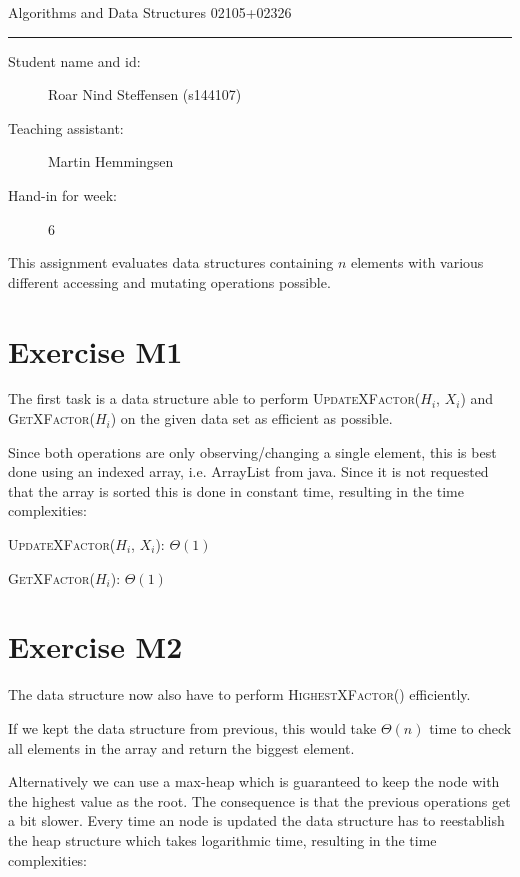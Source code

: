 \documentclass[10pt]{article}
\begin{document}
\begin{center}
{{\Large \sc Algorithms and Data Structures 02105+02326}}
\end{center}
\rule{\textwidth}{1pt}
\begin{description}
\item[Student name and id:] Roar Nind Steffensen (s144107)
\item[Teaching assistant:] Martin Hemmingsen
\item[Hand-in for week:] 6
\end{description}

\vspace{1cm}
This assignment evaluates data structures containing $n$ elements with various different accessing and mutating operations possible.

\section*{Exercise M1}

The first task is a data structure able to perform \textsc{UpdateXFactor($H_i$, $X_i$)} and \textsc{GetXFactor($H_i$)} on the given data set as efficient as possible.

Since both operations are only observing/changing a single element, this is best done using an indexed array, i.e. ArrayList from java. Since it is not requested that the array is sorted this is done in constant time, resulting in the time complexities:
\begin{center}
\textsc{UpdateXFactor($H_i$, $X_i$)}: $\Theta(1)$

\textsc{GetXFactor($H_i$)}: $\Theta(1)$
\end{center}
\section*{Exercise M2}

The data structure now also have to perform \textsc{HighestXFactor()} efficiently. 

If we kept the data structure from previous, this would take $\Theta(n)$ time to check all elements in the array and return the biggest element.

Alternatively we can use a max-heap which is guaranteed to keep the node with the highest value as the root. The consequence is that the previous operations get a bit slower. Every time an node is updated the data structure has to reestablish the heap structure which takes logarithmic time, resulting in the time complexities:
\end{document}
